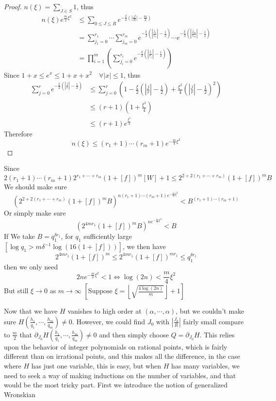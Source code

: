 \begin{proof}
$ n(\xi) = \sum_{J \in S} 1 $, thus 
$$
\begin{aligned}
n(\xi)e^{\frac{m}{2}\xi^{2}} &\leq \sum_{0\leq J\leq R}e^{-\frac{\xi}{2}(|\frac{J}{R}|-\frac{m}{2})} \\
                             &= \sum_{j_{1}=0}^{r_{1}}\cdots\sum_{j_{m}=0}^{r_{m}}
                                e^{-\frac{\xi}{2}(|\frac{j_{1}}{r_{1}}|-\frac{1}{2})}\cdots
                                e^{-\frac{\xi}{2}(|\frac{j_{m}}{r_{m}}|-\frac{1}{2})} \\
                             &= \prod_{i=1}^{m} \left( \sum_{j_{i}=0}^{r_{i}} e^{-\frac{\xi}{2}(|\frac{j_{i}}{r_{i}}|-\frac{1}{2})} \right)
\end{aligned}
$$
Since $ 1+x \leq e^{x} \leq 1+x+x^{2} \quad \forall |x|\leq 1 $, thus
$$
\begin{aligned}
\sum_{j=0}^{r} e^{-\frac{\xi}{2}(|\frac{j}{r}|-\frac{1}{2})}
&\leq\sum_{j=0}^{r} \left( 1 - \frac{\xi}{2}\left(\left|\frac{j}{r}\right|-\frac{1}{2}\right) + 
 \frac{\xi^{2}}{4}\left(\left|\frac{j}{r}\right|-\frac{1}{2}\right)^{2} \right) \\
&\leq (r+1)\left(1+\frac{\xi^{2}}{4}\right) \\
&\leq (r+1)e^{\frac{\xi^{2}}{4}}
\end{aligned}
$$
Therefore
$$ n(\xi) \leq (r_{1}+1)\cdots(r_{m}+1)e^{-\frac{m}{4}\xi^{2}} $$
\end{proof}

Since
$$ 2(r_{1}+1)\cdots(r_{m}+1)2^{r_{1}+\cdots+r_{m}}(1+[f])^{m}[W]+1 \leq 2^{2+2(r_{1}+\cdots+r_{m})}(1+[f])^{m}B $$
We should make sure 
$$ \left( 2^{2+2(r_{1}+\cdots+r_{m})}(1+[f])^{m}B \right)^{n(r_{1}+1)\cdots(r_{m}+1)e^{-\frac{m}{4}\xi^{2}}} < 
B^{(r_{1}+1)\cdots(r_{m}+1)} $$
Or simply make sure
$$ \left( 2^{4mr_{1}}(1+[f])^{m}B \right)^{ne^{-\frac{m}{4}\xi^{2}}} < B $$
If We take $ B = q_{1}^{\delta r_{1}} $, for $ q_{1} $ sufficiently large $ \left[ \log q_{1} > m\delta^{-1}\log\left(16(1+[f])\right) \right] $, we then have
$$ 2^{4mr_{1}}(1+[f])^{m} \leq 2^{4mr_{1}}(1+[f])^{mr_{1}} \leq q_{1}^{\delta r_{1}} $$ then we only need
$$ 2ne^{-\frac{m}{4}\xi^{2}} < 1 \Leftrightarrow \log(2n) < \frac{m}{4}\xi^{2} $$
But still $ \xi \rightarrow 0 $ as $ m \rightarrow \infty $ $ \left[ \text{Suppose } \xi = \left\lfloor\sqrt{\frac{4\log(2n)}{m}}\right\rfloor + 1 \right] $ \par
Now that we have $ H $ vanishes to high order at $ (\alpha,\cdots,\alpha) $, but we couldn't make sure $ H\left(\frac{h_{1}}{q_{1}},\cdots,\frac{h_{m}}{q_{m}}\right) \neq 0 $. However, we could find $ J_{0} $ with $ \left| \frac{J_{0}}{R} \right| $ fairly small compare to $ \frac{m}{2} $ that $ \partial_{J_{0}}H\left(\frac{h_{1}}{q_{1}},\cdots,\frac{h_{m}}{q_{m}}\right) \neq 0 $ and then simply choose $ Q = \partial_{J_{0}}H $. This relies upon the behavior of integer polynomials on rational points, which is fairly different than on irrational points, and this makes all the difference, in the case where $ H $ has just one variable, this is easy, but when $ H $ has many variables, we need to seek a way of making inductions on the number of variables, and that would be the most tricky part. First we introduce the notion of generalized Wronskian

